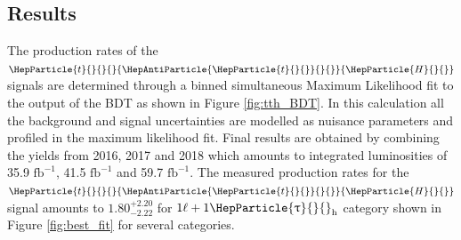 \documentclass[12pt, a4paper]{article}
\DeclareRobustCommand{\PH}{{\HepParticle{H}{}{}}\xspace}
\DeclareRobustCommand{\PQt}{\HepParticle{t}{}{}} %
\DeclareRobustCommand{\PAQt}{{\HepAntiParticle{\PQt}{}{}}\xspace} %
\DeclareRobustCommand{\PGt}{{\HepParticle{\uptau}{}{}}\xspace} %
\newcommand{\ttbar}{\PQt{}\PAQt} %
\newcommand{\tauh}{\ensuremath{\PGt_\mathrm{h}}\xspace}
\begin{document}
\subsection{Results}
The production rates of the $\ttbar\PH$ signals are determined through a binned simultaneous
Maximum Likelihood fit to the output of the BDT as shown in Figure \ref{fig:tth_BDT}. In this calculation all the background and signal uncertainties are modelled as nuisance parameters and profiled in the maximum likelihood fit. Final results are obtained by combining the yields from 2016, 2017 and 2018 which amounts to integrated luminosities of 35.9 $\text{fb}^{-1}$, 41.5 $\text{fb}^{-1}$ and 59.7 $\text{fb}^{-1}$. The measured production rates for the $\ttbar\PH$ signal amounts to $1.80_{-2.22}^{+2.20}$ for $1\ell+1\tauh$ category shown in Figure \ref{fig:best_fit} for several categories.
\end{document}
